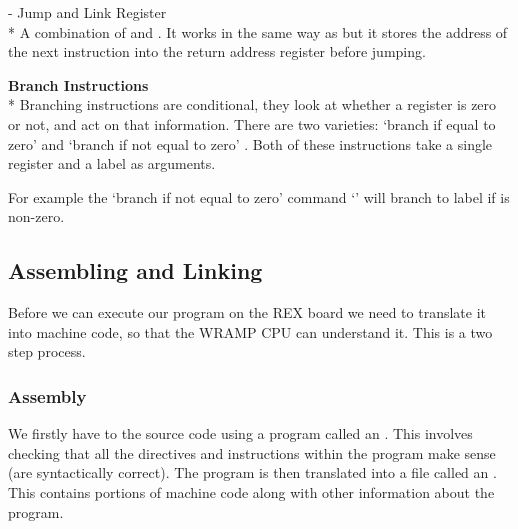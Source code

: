  - Jump and Link Register\\* A combination of
 and . It works in the same way as  but it
stores the address of the next instruction into the return address
register before jumping. 

\textbf{Branch Instructions}\\*
Branching instructions are conditional, they look at whether a
register is zero or not, and act on that information.  There are two
varieties: `branch if equal to zero'  and `branch if not
equal to zero' .  Both of these instructions take a single
register and a label as arguments.

For example the `branch if not equal to zero' command 
`' will branch to label 
 if  is non-zero.

\begin{comment}
\subsection{I/O Routines}

In the example program you will see we have used the routines
\src{putstr}, \src{readnum} and \src{writenum} to perfrom input
and output.  These routines are in the file \LIBEXTWO, which we will 
\BI{link} to.  Here is an overview of the routines:
\begin{description}
\item[\src{putstr}] is used to write a string to the Linux machine.  Put the
address of the string into register \reg{2}.
\item[\src{readnum}] reads a number from the Linux machine, leaving it in
register \reg{1}.
\item[\src{writenum}] will write the number in register \reg{2} to the 
Linux machine.
\end{description}
\end{comment}

\subsection{Assembling and Linking}
Before we can execute our program on the REX board we need to translate it 
into machine code, so that the WRAMP CPU can understand it.  This is a two
step process.

\subsubsection{Assembly}
We firstly have to  the source code using a program
called an .  This involves checking that all the
directives and instructions within the program make sense (are
syntactically correct).  The program is then translated into a file
called an . This contains portions of machine code
along with other information about the program.

